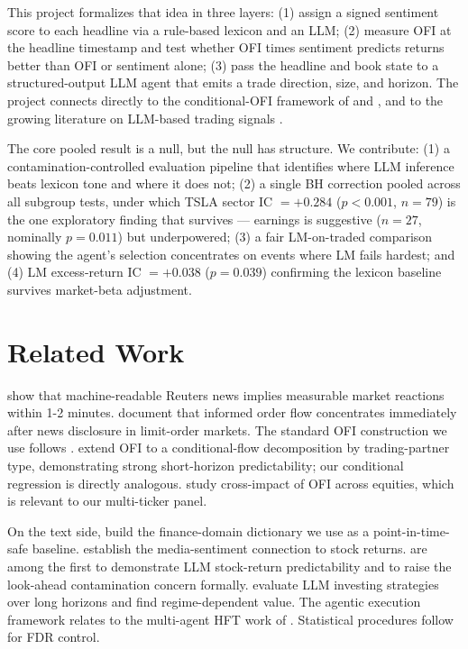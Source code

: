 \documentclass[11pt, letterpaper]{article}
\begin{document}
This project formalizes that idea in three layers: (1) assign a signed sentiment score
to each headline via a rule-based lexicon and an LLM; (2) measure OFI at the headline
timestamp and test whether OFI times sentiment predicts returns better than OFI or
sentiment alone; (3) pass the headline and book state to a structured-output LLM agent
that emits a trade direction, size, and horizon. The project connects directly to the
conditional-OFI framework of \citet{lu2024trade} and \citet{cont2023cross}, and to the
growing literature on LLM-based trading signals \citep{lopezlira2023chatgpt, li2025llm_kdd}.

The core pooled result is a null, but the null has structure. We contribute: (1) a
contamination-controlled evaluation pipeline that identifies where LLM inference beats
lexicon tone and where it does not; (2) a single BH correction pooled across all
subgroup tests, under which TSLA sector IC $= +0.284$ ($p < 0.001$, $n = 79$)
is the one exploratory finding that survives --- earnings is suggestive ($n = 27$,
nominally $p = 0.011$) but underpowered; (3) a fair LM-on-traded comparison showing
the agent's selection concentrates on events where LM fails hardest; and (4) LM
excess-return IC $= +0.038$ ($p = 0.039$) confirming the lexicon baseline survives
market-beta adjustment.

\section{Related Work}
\label{sec:related}

\citet{grossklussmann2011machines} show that machine-readable Reuters news implies
measurable market reactions within 1-2 minutes. \citet{riordan2013public} document
that informed order flow concentrates immediately after news disclosure in limit-order
markets. The standard OFI construction we use follows \citet{cont2014price}.
\citet{lu2024trade} extend OFI to a conditional-flow decomposition by trading-partner
type, demonstrating strong short-horizon predictability; our conditional regression is
directly analogous. \citet{cont2023cross} study cross-impact of OFI across equities,
which is relevant to our multi-ticker panel.

On the text side, \citet{loughran2011liability} build the finance-domain dictionary
we use as a point-in-time-safe baseline. \citet{tetlock2007content} establish the
media-sentiment connection to stock returns. \citet{lopezlira2023chatgpt} are among
the first to demonstrate LLM stock-return predictability and to raise the look-ahead
contamination concern formally. \citet{li2025llm_kdd} evaluate LLM investing strategies
over long horizons and find regime-dependent value. The agentic execution framework
relates to the multi-agent HFT work of \citet{mohl2025jaxmarl}. Statistical procedures
follow \citet{benjamini1995controlling} for FDR control.
\end{document}
